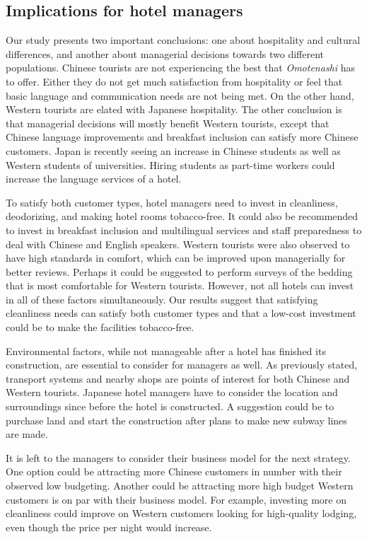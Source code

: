 \documentclass[smallextended,natbib]{svjour3}       %
\begin{document}
\subsection{Implications for hotel managers}\label{disc:implications}

Our study presents two important conclusions: one about hospitality and cultural differences, and another about managerial decisions towards two different populations. Chinese tourists are not experiencing the best that \textit{Omotenashi} has to offer. Either they do not get much satisfaction from hospitality or feel that basic language and communication needs are not being met. On the other hand, Western tourists are elated with Japanese hospitality. The other conclusion is that managerial decisions will mostly benefit Western tourists, except that Chinese language improvements and breakfast inclusion can satisfy more Chinese customers. Japan is recently seeing an increase in Chinese students as well as Western students of universities. Hiring students as part-time workers could increase the language services of a hotel.

To satisfy both customer types, hotel managers need to invest in cleanliness, deodorizing, and making hotel rooms tobacco-free. It could also be recommended to invest in breakfast inclusion and multilingual services and staff preparedness to deal with Chinese and English speakers. Western tourists were also observed to have high standards in comfort, which can be improved upon managerially for better reviews. Perhaps it could be suggested to perform surveys of the bedding that is most comfortable for Western tourists. However, not all hotels can invest in all of these factors simultaneously. Our results suggest that satisfying cleanliness needs can satisfy both customer types and that a low-cost investment could be to make the facilities tobacco-free. 

Environmental factors, while not manageable after a hotel has finished its construction, are essential to consider for managers as well. As previously stated, transport systems and nearby shops are points of interest for both Chinese and Western tourists. Japanese hotel managers have to consider the location and surroundings since before the hotel is constructed. A suggestion could be to purchase land and start the construction after plans to make new subway lines are made. 

It is left to the managers to consider their business model for the next strategy. One option could be attracting more Chinese customers in number with their observed low budgeting. Another could be attracting more high budget Western customers is on par with their business model. For example, investing more on cleanliness could improve on Western customers looking for high-quality lodging, even though the price per night would increase.
\end{document}
